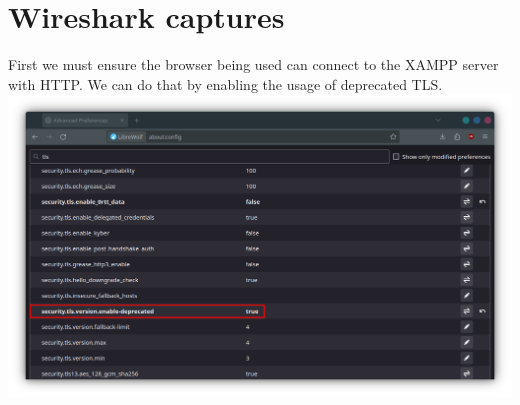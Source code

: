 \documentclass[11pt,a4paper]{report}
\begin{document}
    
    \section{Wireshark captures}
        First we must ensure the browser being used can connect to the XAMPP server with HTTP. We can do that by enabling the usage of deprecated TLS.
        \includegraphics[scale=0.3]{librewolf_tls} 
\end{document}
